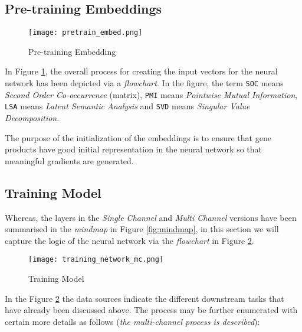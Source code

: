\begin{sloppypar*}
    \subsection{Pre-training Embeddings}
        \begin{figure}
            \centering
            \texttt{[image: pretrain\_embed.png]}
            \caption{Pre-training Embedding}
            \label{fig:pretrain}
        \end{figure}
        In Figure \ref{fig:pretrain}, the overall process for creating the input vectors 
        for the neural network has been depicted via a \textit{flowchart}. In the figure,
        the term \verb|SOC| means \textit{Second Order Co-occurrence} (matrix), \verb|PMI|
        means \textit{Pointwise Mutual Information}, \verb|LSA| means \textit{Latent Semantic Analysis}
        and \verb|SVD| means \textit{Singular Value Decomposition}.\hfill\newline

        \noindent The purpose of the initialization of the embeddings is to ensure that
        gene products have good initial representation in the neural network so that meaningful
        gradients are generated.

    \subsection{Training Model}
        Whereas, the layers in the \textit{Single Channel} and \textit{Multi Channel}
        versions have been summarised in the \textit{mindmap} in Figure \ref{fig:mindmap},
        in this section we will capture the logic of the neural network via the \textit{flowchart}
        in Figure \ref{fig:network}.

        \begin{figure}
            \centering
            \texttt{[image: training\_network\_mc.png]}
            \caption{Training Model}
            \label{fig:network}
        \end{figure}

        \noindent In the Figure \ref{fig:network} the data sources indicate the
        different downstream tasks that have already been discussed above. The process
        may be further enumerated with certain more details as follows (\textit{the multi-channel
        process is described}):


\end{sloppypar*}

